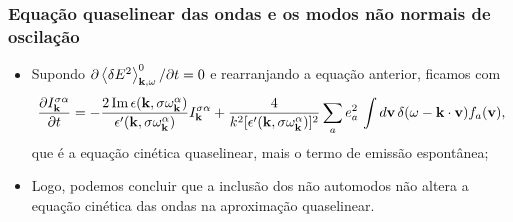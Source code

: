 \documentclass[10pt,aspectratio=1610,lualatex]{beamer}
\begin{document}
\begin{frame}
  \frametitle{Equação quaselinear das ondas e os modos não normais de
    oscilação}
  \begin{itemize}
    \item Supondo
    $\partial \left< \delta E^2 \right>_{{\bf k},\omega}^0/\partial
    t=0$ e rearranjando a equação anterior, ficamos com
    \begin{equation*}
      \begin{split}
	\label{eigenmode-ql2}
	\frac{\partial I_{\bf k}^{\sigma \alpha}}{\partial t}
	=-\frac{2\,\mbox{Im}\,\epsilon({\bf k},
	  \sigma\omega_{\bf k}^\alpha)}
	{\epsilon '({\bf k},\sigma\omega_{\bf k}^\alpha)}
	I_{\bf k}^{\sigma \alpha}
	+\frac{4}{k^2[\epsilon '({\bf k},
	  \sigma\omega_{\bf k}^\alpha)]^2} \sum_a e^2_a\,
	\int d{\bf v}\,\delta(\omega-{\bf k \cdot v})f_a({\bf v}),
      \end{split}
    \end{equation*}
    que é a equação cinética quaselinear, mais o termo de emissão
    espontânea;
    \vspace{0.5cm}
    \pause
    \item Logo, podemos concluir que a inclusão dos não automodos
    não altera a equação cinética das ondas na aproximação quaselinear.
  \end{itemize}
\end{frame}
\end{document}
